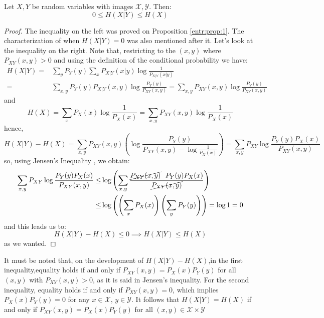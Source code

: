 \begin{nprop}\label{entr:prop:2}
Let $X,Y$ be random variables with images $\mathcal X, \mathcal Y$. Then:
$$
0 \leq H(X|Y) \leq H(X)
$$
\end{nprop}
\begin{proof}

The inequality on the left was proved on Proposition \ref{entr:prop:1}. The characterization of when $H(X|Y) = 0$ was also mentioned after it.  Let's look at the inequality on the right. Note that, restricting to the $(x,y)$ where $P_{XY}(x,y) > 0$ and using the definition of the conditional probability we have:
\begin{align*}
H(X|Y) = & \sum_y P_Y(y) \sum_x P_{X|Y}(x|y)\log \frac{1}{P_{X|Y}(x|y)}\\ = & \sum_{x,y} P_Y(y) P_{X|Y}(x,y) \log \frac{P_Y(y)}{P_{XY}(x,y)} = \sum_{x,y} P_{XY}(x,y)\log \frac{P_Y(y)}{P_{XY}(x,y)} 
\end{align*}
and 
$$
H(X) = \sum_x P_X(x) \log \frac{1}{P_X(x)} = \sum_{x,y}P_{XY}(x,y) \log \frac{1}{P_X(x)}
$$
hence,
$$
H(X|Y) - H(X) = \sum_{x,y}P_{XY}(x,y) \left( \log \frac{P_Y(y)}{P_{XY}(x,y) - \log \frac{1}{P_X(x)}}\right) = \sum_{x,y}P_{XY}\log \frac{P_Y(y)P_X(x)}{P_{XY}(x,y)}
$$
so, using Jensen's Inequality , we obtain:
\begin{align*}
\sum_{x,y}P_{XY}\log \frac{P_Y(y)P_X(x)}{P_{XY}(x,y)} \leq & \log \left( \sum_{x,y}\frac{ \cancel{P_{XY}(x,y)} \ \  P_Y(y) P_X(x)}{\cancel{P_{XY}(x,y)}} \right) \\ \leq & \log\left( \left( \sum_x P_X(x) \right) \left(\sum_y P_Y(y)\right)\right) = \log 1 = 0
\end{align*}
and this leads us to:
$$
H(X|Y) - H(X) \leq 0 \implies H(X|Y) \leq H(X)
$$
as we wanted.
\end{proof}

It must be noted that, on the development of $H(X|Y) - H(X)$,in the first inequality,equality holds if and only if $P_{XY}(x,y) = P_X(x) P_Y(y)$ for all $(x,y)$ with $P_{XY} (x,y) > 0$, as it is said in Jensen's inequality. For the second inequality, equality holds if and only if $P_{XY}(x,y) = 0$, which implies $P_X(x)P_Y(y) = 0$ for any $x\in \mathcal X$, $y \in \mathcal Y$. It follows that $H(X|Y) = H(X)$ if and only if $P_{XY}(x,y) = P_X(x)P_Y(y)$ for all $(x,y) \in \mathcal X \times \mathcal Y$

